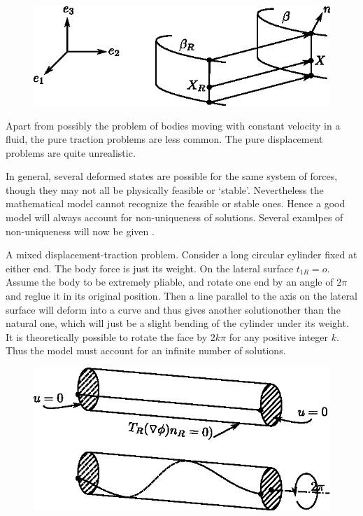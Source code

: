 \begin{figure}[H]
\centering
\includegraphics{vol71-figures/fig2.1-2.eps}
\medskip
\caption{}\label{fig2.1.2}
\end{figure}\pageoriginale

Apart from possibly the problem of bodies moving with constant
velocity in a fluid, the pure traction problems are less common. The
pure displacement problems are quite unrealistic. 

In general, several deformed states are possible for the same system
of forces, though they may not all be physically feasible or `stable'.
Nevertheless the mathematical model cannot recognize the feasible or
stable ones. Hence a good model will always account for non-uniqueness
of solutions. Several examlpes of non-uniqueness will now be given . 

\begin{example}\label{chap2-exam2.1.1}%
A mixed displacement-traction problem. Consider a long circular
cylinder fixed at either end. The body force is just its weight. On
the lateral surface $t_{1R} = o$. Assume the body to be extremely
pliable, and rotate one end by an angle of $2 \pi$ and reglue it in
its original position. Then a line parallel to the axis on the lateral
surface will deform into a curve and thus gives another solution\pageoriginale other
than the natural one, which will just be a slight bending of the
cylinder under its weight. It is theoretically possible to rotate the
face by $2 k \pi$ for any positive integer $k$. Thus the model must
account for an infinite number of solutions.  

\begin{figure}[H]
\centering
\includegraphics{vol71-figures/fig2.1-3.eps}
\medskip
\caption{}\label{fig2.1.3}
\end{figure}
\end{example}

